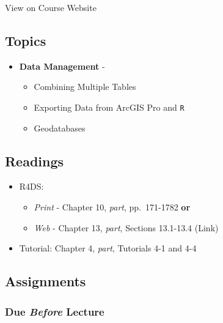 \documentclass[]{book}
\providecommand{\tightlist}{%
  \setlength{\itemsep}{0pt}\setlength{\parskip}{0pt}}
\begin{document}
View on Course Website

\hypertarget{topics-8}{%
\subsection*{Topics}\label{topics-8}}

\begin{itemize}
\tightlist
\item
  \textbf{Data Management} -

  \begin{itemize}
  \tightlist
  \item
    Combining Multiple Tables
  \item
    Exporting Data from ArcGIS Pro and \texttt{R}
  \item
    Geodatabases
  \end{itemize}
\end{itemize}

\hypertarget{readings-9}{%
\subsection*{Readings}\label{readings-9}}

\begin{itemize}
\tightlist
\item
  R4DS:

  \begin{itemize}
  \tightlist
  \item
    \emph{Print} - Chapter 10, \emph{part}, pp.~171-1782 \textbf{or}
  \item
    \emph{Web} - Chapter 13, \emph{part}, Sections 13.1-13.4 (Link)
  \end{itemize}
\item
  Tutorial: Chapter 4, \emph{part}, Tutorials 4-1 and 4-4
\end{itemize}

\hypertarget{assignments-9}{%
\subsection*{Assignments}\label{assignments-9}}

\hypertarget{due-before-lecture-7}{%
\subsubsection*{\texorpdfstring{Due \emph{Before} Lecture}{Due Before Lecture}}\label{due-before-lecture-7}}
\end{document}
